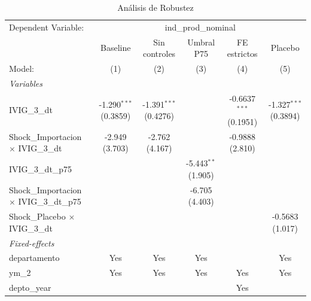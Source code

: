 \documentclass[12pt]{article}
\begin{document}
\setcounter{table}{12}
\begin{table}[htbp]
\centering
\begin{threeparttable}

   \caption{Análisis de Robustez}
   \centering
   \small
   \begin{tabular}{lccccc}
      \tabularnewline \midrule \midrule
      Dependent Variable: & \multicolumn{5}{c}{ind\_prod\_nominal}\\
                                                        & Baseline                & Sin controles           & Umbral P75            & FE estrictos             & Placebo \\   
      Model:                                            & (1)                     & (2)                     & (3)                   & (4)                      & (5)\\  
      \midrule
      \emph{Variables}\\
      IVIG\_3\_dt                                       & -1.290$^{***}$ (0.3859) & -1.391$^{***}$ (0.4276) &                       & -0.6637$^{***}$ (0.1951) & -1.327$^{***}$ (0.3894)\\   
      Shock\_Importacion $\times$ IVIG\_3\_dt           & -2.949 (3.703)          & -2.762 (4.167)          &                       & -0.9888 (2.810)          &   \\   
      IVIG\_3\_dt\_p75                                  &                         &                         & -5.443$^{**}$ (1.905) &                          &   \\   
      Shock\_Importacion $\times$ IVIG\_3\_dt\_p75      &                         &                         & -6.705 (4.403)        &                          &   \\   
      Shock\_Placebo $\times$ IVIG\_3\_dt               &                         &                         &                       &                          & -0.5683 (1.017)\\   
      \midrule
      \emph{Fixed-effects}\\
      departamento                                      & Yes                     & Yes                     & Yes                   &                          & Yes\\  
      ym\_2                                             & Yes                     & Yes                     & Yes                   & Yes                      & Yes\\  
      depto\_year                                       &                         &                         &                       & Yes                      & \\  

\end{tabular}
\end{threeparttable}
\end{table}
\end{document}
